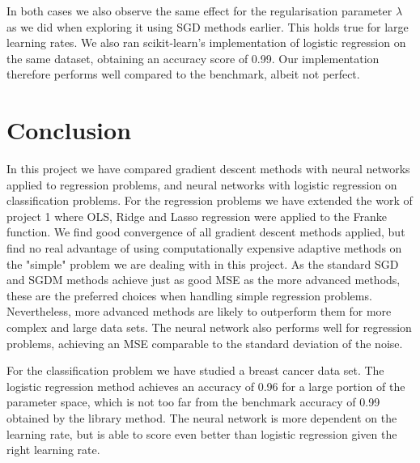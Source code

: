 \documentclass[a4paper,
amsfonts,
amssymb,
amsmath,
reprint,
showkeys,
nofootinbib,
twoside]{revtex4-2}
\begin{document}
In both cases we also observe the same effect for the regularisation parameter $\lambda$ as we did when exploring it using SGD methods earlier. This holds true for large learning rates.
We also ran scikit-learn's implementation of logistic regression on the same dataset, obtaining an accuracy score of 0.99. Our implementation therefore performs well compared to the benchmark, albeit not perfect.


\section{Conclusion}

In this project we have compared gradient descent methods with neural networks applied to regression problems, and neural networks with logistic regression on classification problems.
For the regression problems we have extended the work of project 1 where OLS, Ridge and Lasso regression were applied to the Franke function. We find good convergence of all gradient descent methods applied, but find no real advantage of using computationally expensive adaptive methods on the "simple" problem we are dealing with in this project. As the standard SGD and SGDM methods achieve just as good MSE as the more advanced methods, these are the preferred choices when handling simple regression problems. Nevertheless, more advanced methods are likely to outperform them for more complex and large data sets.
The neural network also performs well for regression problems, achieving an MSE comparable to the standard deviation of the noise.

For the classification problem we have studied a breast cancer data set. The logistic regression method achieves an accuracy of 0.96 for a large portion of the parameter space, which is not too far from the benchmark accuracy of 0.99 obtained by the library method. The neural network is more dependent on the learning rate, but is able to score even better than logistic regression given the right learning rate.

% 








\end{document}
